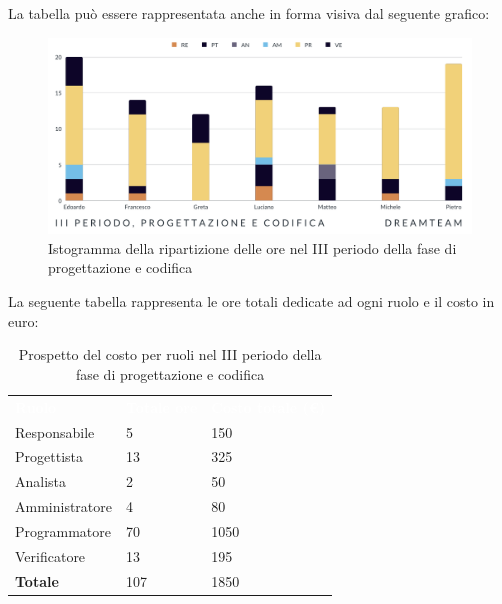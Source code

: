 La tabella può essere rappresentata anche in forma visiva dal seguente grafico:
\begin{figure}[H]
\centering
\includegraphics[scale=0.65]{Sezioni/SezioniPreventivo/grafici/Progettazione_codifica_III_periodo.png}
\caption{Istogramma della ripartizione delle ore nel III periodo della fase di progettazione e codifica}
\end{figure}

La seguente tabella rappresenta le ore totali dedicate ad ogni ruolo e il costo in euro:

\begin{table}[H]
\begin{center}
\renewcommand{\arraystretch}{1.5}
\begin{tabular}{ m{}<{\centering}  m{}<{\centering} m{}<{\centering}}
	\rowcolor{darkblue}
	\textcolor{white}{\textbf{Ruolo}}&\textcolor{white}{\textbf{Totale ore}}&\textcolor{white}{\textbf{Costo totale (\euro)}}\\ 

	Responsabile  & 5 & 150 \\	
	
	Progettista & 13 & 325 \\
	
	Analista & 2 & 50 \\

	Amministratore & 4 & 80 \\
	
	Programmatore & 70 & 1050 \\
	
	Verificatore & 13 & 195 \\
	
	\textbf{Totale} & 107 & 1850 \\
	
\end{tabular}
\caption{Prospetto del costo per ruoli nel III periodo della fase di progettazione e codifica}
\end{center}
\end{table}

